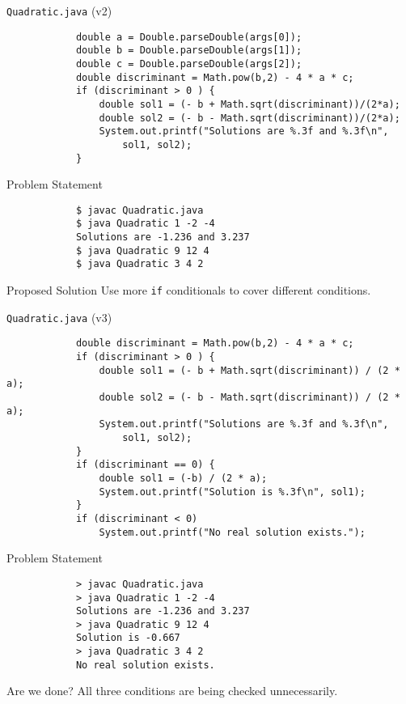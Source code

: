 \documentclass[10pt, compress]{beamer}
\begin{document}
\begin{slide}
	\begin{block}{\texttt{Quadratic.java} (v2)}
		\begin{verbatim}
			double a = Double.parseDouble(args[0]);
			double b = Double.parseDouble(args[1]);
			double c = Double.parseDouble(args[2]);
			double discriminant = Math.pow(b,2) - 4 * a * c;
			if (discriminant > 0 ) {
			    double sol1 = (- b + Math.sqrt(discriminant))/(2*a);
			    double sol2 = (- b - Math.sqrt(discriminant))/(2*a);
			    System.out.printf("Solutions are %.3f and %.3f\n",
			        sol1, sol2);
			}
		\end{verbatim}
	\end{block}
\end{slide}

\begin{slide}
	\begin{block}{Problem Statement}
		\begin{verbatim}
			$ javac Quadratic.java
			$ java Quadratic 1 -2 -4
			Solutions are -1.236 and 3.237
			$ java Quadratic 9 12 4
			$ java Quadratic 3 4 2
		\end{verbatim}
	\end{block}
	\begin{block}{Proposed Solution}
		Use more \texttt{if} conditionals to cover different conditions.
	\end{block}
\end{slide}

\begin{slide}
	\begin{block}{\texttt{Quadratic.java} (v3)}
		\begin{verbatim}
			double discriminant = Math.pow(b,2) - 4 * a * c;
			if (discriminant > 0 ) {
			    double sol1 = (- b + Math.sqrt(discriminant)) / (2 * a);
			    double sol2 = (- b - Math.sqrt(discriminant)) / (2 * a);
			    System.out.printf("Solutions are %.3f and %.3f\n",
			        sol1, sol2);
			}
			if (discriminant == 0) {
			    double sol1 = (-b) / (2 * a);
			    System.out.printf("Solution is %.3f\n", sol1);
			}
			if (discriminant < 0)
			    System.out.printf("No real solution exists.");
		\end{verbatim}
	\end{block}
\end{slide}

\begin{slide}
	\begin{block}{Problem Statement}
		\begin{verbatim}
			> javac Quadratic.java
			> java Quadratic 1 -2 -4
			Solutions are -1.236 and 3.237
			> java Quadratic 9 12 4
			Solution is -0.667
			> java Quadratic 3 4 2
			No real solution exists.
		\end{verbatim}
	\end{block}
	\begin{block}{Are we done?}
		All three conditions are being checked unnecessarily.
	\end{block}
\end{slide}
\end{document}

